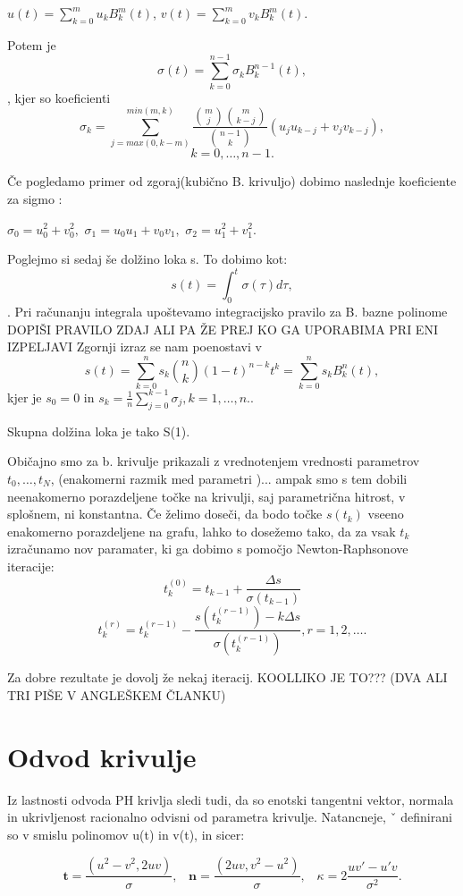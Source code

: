 \documentclass[12pt]{article}
\begin{document}
	$u (t)=\sum_{k=0}^m u_kB_k^m(t)$, 
	$v (t) =\sum_{k=0}^m v_kB_k^m(t).$

Potem je 
$$\sigma (t) =\sum_{k=0}^{n-1} \sigma_kB_k^{n-1}(t),$$, 
kjer so koeficienti 
$$\sigma_k =\sum_{j=max(0,k-m)}^{min(m,k)}\frac{\binom{m}{j}\binom{m}{k-j}}{\binom{n-1}{k}}(u_ju_{k-j}+v_jv_{k-j}),$$ $$k = 0,\ldots , n - 1.$$

Če pogledamo primer od zgoraj(kubično B. krivuljo) dobimo naslednje koeficiente za sigmo :

$\sigma_0 = u^2_0+ v^2_0, $
$\sigma_1 = u_0u_1 + v_0v_1,$ 
$\sigma_2 = u^2_1+ v^2_1.$

Poglejmo si sedaj še dolžino loka s.
To dobimo kot:
$$s (t) =\int^t_0\sigma(\tau) d\tau,$$.
Pri računanju integrala upoštevamo integracijsko pravilo za B. bazne polinome 
DOPIŠI PRAVILO ZDAJ ALI PA ŽE PREJ KO GA UPORABIMA PRI ENI IZPELJAVI
Zgornji izraz se nam poenostavi v 
$$s (t) =\sum^n_{k=0}s_k\binom{n}{k}(1-t)^{n-k}t^k=\sum_{k=0}^n s_kB^n_k(t),$$
	kjer je $s_0=0$ in $s_k=\frac{1}{n}\sum^{k-1}_{j=0}\sigma_j, k=1,\ldots,n.$.

Skupna dolžina loka je tako S(1). 

Običajno smo za  b. krivulje prikazali z vrednotenjem vrednosti parametrov  $t_0,\ldots , t_N$,
(enakomerni razmik med parametri )... 
ampak smo s tem dobili neenakomerno porazdeljene točke na krivulji, saj parametrična 
hitrost, v splošnem, ni konstantna.
Če želimo doseči, da bodo točke $s(t_k)$ vseeno enakomerno porazdeljene na grafu,
lahko to dosežemo tako, da za vsak $t_k$ izračunamo nov paramater, ki ga dobimo 
s pomočjo Newton-Raphsonove iteracije: 
$$t^{(0)}_k = t_{k-1}+\frac{\Delta s}{\sigma(t_{k-1})}$$
$$t^{(r)}_k = t^{(r-1)}_k-\frac{s(t^{(r-1)}_k)-k\Delta s}{\sigma(t^{(r-1)}_k)}, r = 1, 2,\ldots.$$

Za dobre rezultate je dovolj že nekaj iteracij. KOOLLIKO JE TO??? (DVA ALI TRI PIŠE V ANGLEŠKEM ČLANKU)

\section*{Odvod krivulje}
Iz lastnosti odvoda PH krivlja sledi tudi, da so enotski tangentni vektor,
normala in ukrivljenost racionalno odvisni od parametra krivulje. Natancneje, ˇ
definirani so v smislu polinomov u(t) in v(t), in sicer: 

$$\textbf{t} =\frac{(u^2 - v^2, 2uv)}{\sigma},\hspace{10pt} \textbf{n} =\frac{(2uv, v^2 - u^2)}{\sigma},\hspace{10pt} \kappa = 2 \frac{uv\prime - u\prime v}{\sigma^2}.$$
\end{document}
